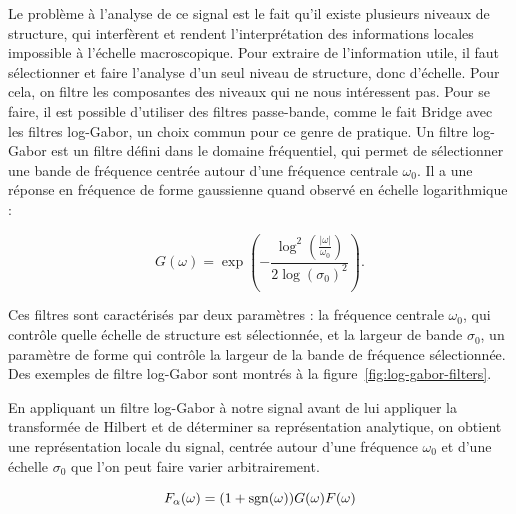 Le problème à l'analyse de ce signal est le fait qu'il existe plusieurs niveaux de structure, qui interfèrent et rendent l'interprétation des informations locales impossible à l'échelle macroscopique.
Pour extraire de l'information utile, il faut sélectionner et faire l'analyse d'un seul niveau de structure, donc d'échelle.
Pour cela, on filtre les composantes des niveaux qui ne nous intéressent pas.
Pour se faire, il est possible d'utiliser des filtres passe-bande, comme le fait Bridge avec les filtres log-Gabor, un choix commun pour ce genre de pratique.
Un filtre log-Gabor est un filtre défini dans le domaine fréquentiel, qui permet de sélectionner une bande de fréquence centrée autour d'une fréquence centrale $\omega_0$.
Il a une réponse en fréquence de forme gaussienne quand observé en échelle logarithmique :

\begin{equation}
    G(\omega) = \exp\left(-\frac{\log^2(\frac{|\omega|}{\omega_0})}{2\log(\sigma_0)^2}\right).
\end{equation}

Ces filtres sont caractérisés par deux paramètres : la fréquence centrale $\omega_0$, qui contrôle quelle échelle de structure est sélectionnée, et la largeur de bande $\sigma_0$, un paramètre de forme qui contrôle la largeur de la bande de fréquence sélectionnée. Des exemples de filtre log-Gabor sont montrés à la figure~\ref{fig:log-gabor-filters}.

En appliquant un filtre log-Gabor à notre signal avant de lui appliquer la transformée de Hilbert et de déterminer sa représentation analytique, on obtient une représentation locale du signal, centrée autour d'une fréquence $\omega_0$ et d'une échelle $\sigma_0$ que l'on peut faire varier arbitrairement.

\begin{equation}
    F_{\alpha}(\omega) = (1+\operatorname{sgn}(\omega))G(\omega)F(\omega)
\end{equation}

